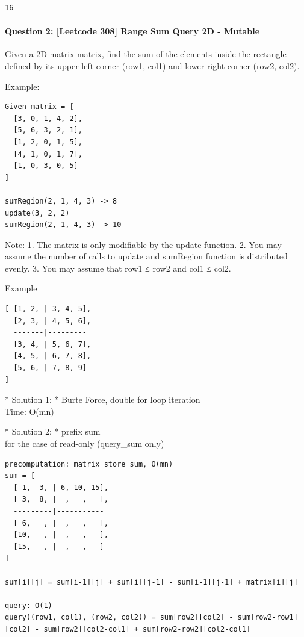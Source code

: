 \documentclass[11pt]{article}
\begin{document}
    \begin{Verbatim}[commandchars=\\\{\}]
16

    \end{Verbatim}

    \paragraph{Question 2: {[}Leetcode 308{]} Range Sum Query 2D -
Mutable}\label{question-2-leetcode-308-range-sum-query-2d---mutable}

Given a 2D matrix matrix, find the sum of the elements inside the
rectangle defined by its upper left corner (row1, col1) and lower right
corner (row2, col2).

Example:

\begin{verbatim}
Given matrix = [
  [3, 0, 1, 4, 2],
  [5, 6, 3, 2, 1],
  [1, 2, 0, 1, 5],
  [4, 1, 0, 1, 7],
  [1, 0, 3, 0, 5]
]

sumRegion(2, 1, 4, 3) -> 8
update(3, 2, 2)
sumRegion(2, 1, 4, 3) -> 10
\end{verbatim}

Note: 1. The matrix is only modifiable by the update function. 2. You
may assume the number of calls to update and sumRegion function is
distributed evenly. 3. You may assume that row1 ≤ row2 and col1 ≤ col2.

    Example

\begin{verbatim}
[ [1, 2, | 3, 4, 5],
  [2, 3, | 4, 5, 6],
  -------|---------
  [3, 4, | 5, 6, 7],
  [4, 5, | 6, 7, 8],
  [5, 6, | 7, 8, 9]
]
\end{verbatim}

 * Solution 1: * Burte Force, double for loop iteration\\
Time: O(mn)

 * Solution 2: * prefix sum\\
for the case of read-only (query\_sum only)

\begin{verbatim}
precomputation: matrix store sum, O(mn)
sum = [
  [ 1,  3, | 6, 10, 15],
  [ 3,  8, |  ,   ,   ],
  ---------|-----------
  [ 6,   , |  ,   ,   ],
  [10,   , |  ,   ,   ],
  [15,   , |  ,   ,   ]
]

sum[i][j] = sum[i-1][j] + sum[i][j-1] - sum[i-1][j-1] + matrix[i][j]

query: O(1)
query((row1, col1), (row2, col2)) = sum[row2][col2] - sum[row2-row1][col2] - sum[row2][col2-col1] + sum[row2-row2][col2-col1]
\end{verbatim}
\end{document}
